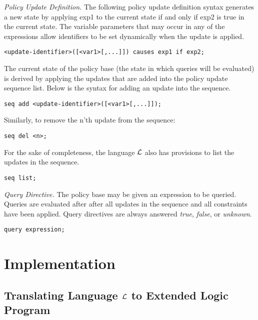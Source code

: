 \documentclass{llncs}
\begin{document}
    \emph{Policy Update Definition.} The following policy update definition
    syntax generates a new state by applying exp1 to the current state
    if and only if exp2 is true in the current state. The variable
    parameters that may occur in any of the expressions allow identifiers
    to be set dynamically when the update is applied.

    \begin{verbatim}<update-identifier>([<var1>[,...]]) causes exp1 if exp2;\end{verbatim}

    The current state of the policy base (the state in which queries will be
    evaluated) is derived by applying the updates that are added into
    the policy update sequence list. Below is the syntax for adding an
    update into the sequence.

    \begin{verbatim}seq add <update-identifier>([<var1>[,...]]);\end{verbatim}

    Similarly, to remove the n'th update from the sequence:

    \begin{verbatim}seq del <n>;\end{verbatim}

    For the sake of completeness, the language $\cal{L}$ also has provisions to
    list the updates in the sequence.

    \begin{verbatim}seq list;\end{verbatim}

    \emph{Query Directive.} The policy base may be given an expression to be
    queried. Queries are evaluated after after all updates in the
    sequence and all constraints have been applied. Query directives are
    always answered \emph{true}, \emph{false}, or \emph{unknown}.

    \begin{verbatim}query expression;\end{verbatim}

  \section{Implementation}

    \subsection{Translating Language $\cal{L}$ to Extended Logic Program}
\end{document}
